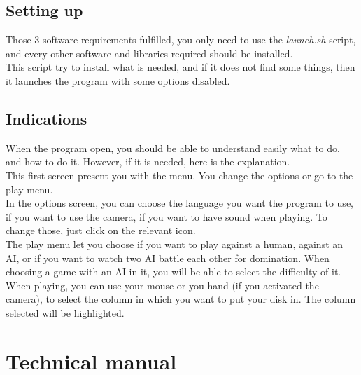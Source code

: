 \documentclass[12pt, a4paper, oneside]{report}
\begin{document}
	\section{Setting up}
	Those 3 software requirements fulfilled, you only need to use the \textit{launch.sh} script, and every other software and libraries required should be installed. \\
	This script try to install what is needed, and if it does not find some things, then it launches the program with some options disabled.

	\section{Indications}
	When the program open, you should be able to understand easily what to do, and how to do it. However, if it is needed, here is the explanation. \\

	This first screen present you with the menu. You change the options or go to the play menu. \\
	\hspace*{1cm} In the options screen, you can choose the language you want the program to use, if you want to use the camera, if you want to have sound when playing. To change those, just click on the relevant icon. \\
	\hspace*{1cm} The play menu let you choose if you want to play against a human, against an AI, or if you want to watch two AI battle each other for domination. When choosing a game with an AI in it, you will be able to select the difficulty of it. \\

	When playing, you can use your mouse or you hand (if you activated the camera), to select the column in which you want to put your disk in. The column selected will be highlighted.

	\chapter{Technical manual}
\end{document}
